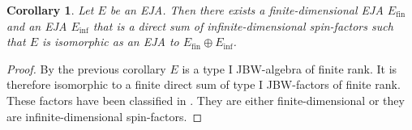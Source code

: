 \documentclass[submission,copyright,creativecommons]{eptcs}
\newcounter{main}
\newtheorem{corollary}[main]{Corollary}
\theoremstyle{definition}
\begin{document}
\begin{corollary}\label{appendixjnw}
    Let $E$ be an EJA. Then there exists a finite-dimensional EJA $E_{\text{fin}}$ and an EJA $E_{\text{inf}}$ that is a direct sum of infinite-dimensional spin-factors such that $E$ is isomorphic as an EJA to $E_{\text{fin}} \oplus E_{\text{inf}}$.
\end{corollary}
\begin{proof}
    By the previous corollary $E$ is a type I JBW-algebra of finite rank. It is therefore isomorphic to a finite direct sum of type I JBW-factors of finite rank. These factors have been classified in \cite{hanche1984jordan}. They are either finite-dimensional or they are infinite-dimensional spin-factors.
\end{proof}
\end{document}
